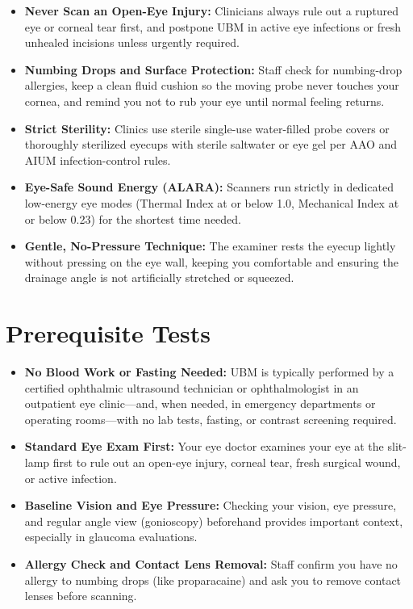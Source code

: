 \begin{itemize}
    \item \textbf{Never Scan an Open-Eye Injury:} Clinicians always rule out a ruptured eye or corneal tear first, and postpone UBM in active eye infections or fresh unhealed incisions unless urgently required.
    \item \textbf{Numbing Drops and Surface Protection:} Staff check for numbing-drop allergies, keep a clean fluid cushion so the moving probe never touches your cornea, and remind you not to rub your eye until normal feeling returns.
    \item \textbf{Strict Sterility:} Clinics use sterile single-use water-filled probe covers or thoroughly sterilized eyecups with sterile saltwater or eye gel per AAO and AIUM infection-control rules.
    \item \textbf{Eye-Safe Sound Energy (ALARA):} Scanners run strictly in dedicated low-energy eye modes (Thermal Index at or below 1.0, Mechanical Index at or below 0.23) for the shortest time needed.
    \item \textbf{Gentle, No-Pressure Technique:} The examiner rests the eyecup lightly without pressing on the eye wall, keeping you comfortable and ensuring the drainage angle is not artificially stretched or squeezed.
\end{itemize}

\section{Prerequisite Tests}

\begin{itemize}
    \item \textbf{No Blood Work or Fasting Needed:} UBM is typically performed by a certified ophthalmic ultrasound technician or ophthalmologist in an outpatient eye clinic---and, when needed, in emergency departments or operating rooms---with no lab tests, fasting, or contrast screening required.
    \item \textbf{Standard Eye Exam First:} Your eye doctor examines your eye at the slit-lamp first to rule out an open-eye injury, corneal tear, fresh surgical wound, or active infection.
    \item \textbf{Baseline Vision and Eye Pressure:} Checking your vision, eye pressure, and regular angle view (gonioscopy) beforehand provides important context, especially in glaucoma evaluations.
    \item \textbf{Allergy Check and Contact Lens Removal:} Staff confirm you have no allergy to numbing drops (like proparacaine) and ask you to remove contact lenses before scanning.
\end{itemize}

